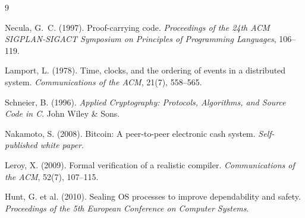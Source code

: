 \documentclass[11pt,a4paper]{article}
\theoremstyle{plain}
\theoremstyle{definition}
\theoremstyle{remark}
\begin{document}

\begin{thebibliography}{9}

Necula, G.~C. (1997).
Proof-carrying code.
\emph{Proceedings of the 24th ACM SIGPLAN-SIGACT Symposium on
Principles of Programming Languages}, 106--119.

Lamport, L. (1978).
Time, clocks, and the ordering of events in a distributed system.
\emph{Communications of the ACM}, 21(7), 558--565.

Schneier, B. (1996).
\emph{Applied Cryptography: Protocols, Algorithms, and Source Code in C}.
John Wiley \& Sons.

Nakamoto, S. (2008).
Bitcoin: A peer-to-peer electronic cash system.
\emph{Self-published white paper}.

Leroy, X. (2009).
Formal verification of a realistic compiler.
\emph{Communications of the ACM}, 52(7), 107--115.

Hunt, G. et al. (2010).
Sealing OS processes to improve dependability and safety.
\emph{Proceedings of the 5th European Conference on Computer Systems}.

\end{thebibliography}
\end{document}
